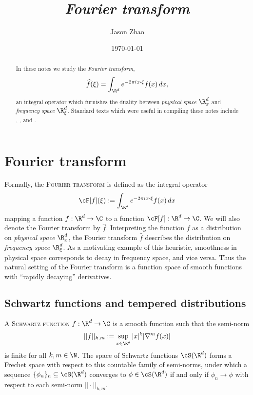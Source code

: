 \documentclass[reqno]{amsart}
\title
{
	\emph{Fourier transform}
}
\author{Jason Zhao}
\date{\today}
\theoremstyle{definition}
\theoremstyle{remark}
\renewcommand{\emph}{\textsc}
\begin{document}
\maketitle

\begin{abstract}
	In these notes we study the \textit{Fourier transform},
		\[ \widehat f (\xi) = \int_{\R^d} e^{-2\pi i x \cdot \xi} f(x) \, dx, \]
	an integral operator which furnishes the duality between \textit{physical space} $\R^d_x$ and \textit{frequency space} $\R^d_\xi$. Standard texts which were useful in compiling these notes include \cite{Tao2006}, \cite[Chapter 1]{Duoandikoetxea2001}, and \cite{Grafakos2014}. 
\end{abstract}

\tableofcontents

\section{Fourier transform}

Formally, the \emph{Fourier transform} is defined as the integral operator
	\[ \cF [f] (\xi) := \int_{\R^d} e^{-2\pi i x \cdot \xi} f(x) \, dx \]
mapping a function $f : \R^d \to \C$ to a function $\cF [f] : \R^d \to \C$. We will also denote the Fourier transform by $\widehat f$. Interpreting the function $f$ as a distribution on \textit{physical space} $\R^d_x$, the Fourier transform $\widehat f$ describes the distribution on \textit{frequency space} $\R^d_\xi$. As a motivating example of this heuristic, smoothness in physical space corresponds to decay in frequency space, and vice versa. Thus the natural setting of the Fourier transform is a function space of smooth functions with ``rapidly decaying'' derivatives. 

\subsection{Schwartz functions and tempered distributions}

A \emph{Schwartz function} $f: \R^d \to \C$ is a smooth function such that the semi-norm
	\[ ||f||_{k, m} := \sup_{x \in \R^d} |x|^k | \nabla^m f (x)| \]
is finite for all $k, m \in \N$. The space of Schwartz functions $\cS (\R^d)$ forms a Frechet space with respect to this countable family of semi-norms, under which a sequence $\{\phi_n\}_n \subseteq \cS (\R^d)$ converges to $\phi \in \cS (\R^d)$ if and only if $\phi_n \to \phi$ with respect to each semi-norm $|| \cdot ||_{k, m}$. 
\end{document}
